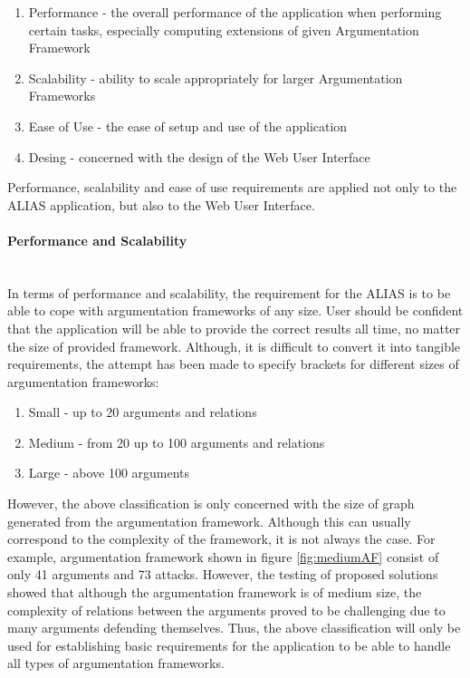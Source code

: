 \begin{enumerate}
	\item Performance - the overall performance of the application when performing certain tasks, especially computing extensions of given Argumentation Framework
	\item Scalability - ability to scale appropriately for larger Argumentation Frameworks
	\item Ease of Use - the ease of setup and use of the application 
	\item Desing - concerned with the design of the Web User Interface
\end{enumerate}

Performance, scalability and ease of use requirements are applied not only to the ALIAS application, but also to the Web User Interface. 

\paragraph{Performance and Scalability} \mbox{} \\

In terms of performance and scalability, the requirement for the ALIAS is to be able to cope with argumentation frameworks of any size. User should be confident that the application will be able to provide the correct results all time, no matter the size of provided framework. Although, it is difficult to convert it into tangible requirements, the attempt has been made to specify brackets for different sizes of argumentation frameworks: 

\begin{enumerate}
	\item Small - up to 20 arguments and relations
	\item Medium - from 20 up to 100 arguments and relations
	\item Large - above 100 arguments 
\end{enumerate}

However, the above classification is only concerned with the size of graph generated from the argumentation framework. Although this can usually correspond to the complexity of the framework, it is not always the case. For example, argumentation framework shown in figure \ref{fig:mediumAF} consist of only 41 arguments and 73 attacks. However, the testing of proposed solutions showed that although the argumentation framework is of medium size, the complexity of relations between the arguments proved to be challenging due to many arguments defending themselves. Thus, the above classification will only be used for establishing basic requirements for the application to be able to handle all types of argumentation frameworks. 

